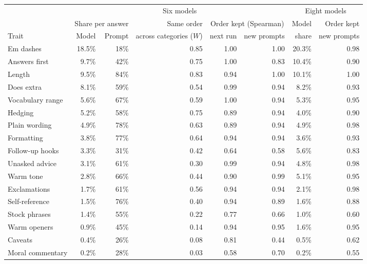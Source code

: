 \begin{tabular}{lrrrrrrr}
\toprule
& \multicolumn{5}{c}{Six models} & \multicolumn{2}{c}{Eight models} \\
\cmidrule(lr){2-6}\cmidrule(lr){7-8}
& \multicolumn{2}{c}{Share per answer} & Same order & \multicolumn{2}{c}{Order kept (Spearman)} & Model & Order kept \\
\cmidrule(lr){2-3}\cmidrule(lr){5-6}
Trait & Model & Prompt & across categories ($W$) & next run & new prompts & share & new prompts \\
\midrule
Em dashes & 18.5\% & 18\% & 0.85 & 1.00 & 1.00 & 20.3\% & 0.98 \\
Answers first & 9.7\% & 42\% & 0.75 & 1.00 & 0.83 & 10.4\% & 0.90 \\
Length & 9.5\% & 84\% & 0.83 & 0.94 & 1.00 & 10.1\% & 1.00 \\
Does extra & 8.1\% & 59\% & 0.54 & 0.99 & 0.94 & 8.2\% & 0.93 \\
Vocabulary range & 5.6\% & 67\% & 0.59 & 1.00 & 0.94 & 5.3\% & 0.95 \\
Hedging & 5.2\% & 58\% & 0.75 & 0.89 & 0.94 & 4.0\% & 0.90 \\
Plain wording & 4.9\% & 78\% & 0.63 & 0.89 & 0.94 & 4.9\% & 0.98 \\
Formatting & 3.8\% & 77\% & 0.64 & 0.94 & 0.94 & 3.6\% & 0.93 \\
Follow-up hooks & 3.3\% & 31\% & 0.42 & 0.64 & 0.58 & 5.6\% & 0.83 \\
Unasked advice & 3.1\% & 61\% & 0.30 & 0.99 & 0.94 & 4.8\% & 0.98 \\
Warm tone & 2.8\% & 66\% & 0.44 & 0.90 & 0.99 & 5.1\% & 0.95 \\
Exclamations & 1.7\% & 61\% & 0.56 & 0.94 & 0.94 & 2.1\% & 0.98 \\
Self-reference & 1.5\% & 76\% & 0.40 & 0.94 & 0.89 & 1.6\% & 0.88 \\
Stock phrases & 1.4\% & 55\% & 0.22 & 0.77 & 0.66 & 1.0\% & 0.60 \\
Warm openers & 0.9\% & 45\% & 0.14 & 0.94 & 0.95 & 1.6\% & 0.95 \\
Caveats & 0.4\% & 26\% & 0.08 & 0.81 & 0.44 & 0.5\% & 0.62 \\
Moral commentary & 0.2\% & 28\% & 0.03 & 0.58 & 0.70 & 0.2\% & 0.55 \\
\bottomrule
\end{tabular}
